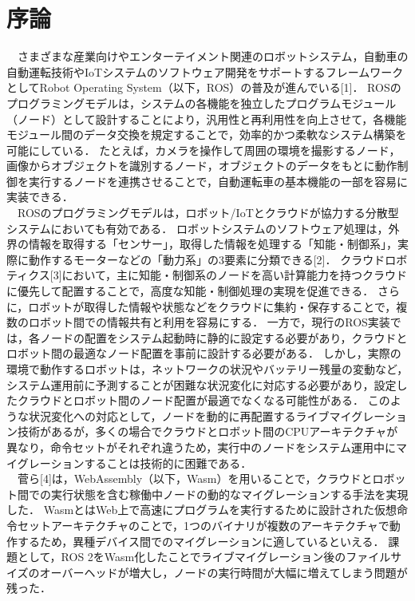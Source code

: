 \chapter{序論}
　さまざまな産業向けやエンターテイメント関連のロボットシステム，自動車の自動運転技術やIoTシステムのソフトウェア開発をサポートするフレームワークとしてRobot Operating System（以下，ROS）の普及が進んでいる[1]．
ROSのプログラミングモデルは，システムの各機能を独立したプログラムモジュール（ノード）として設計することにより，汎用性と再利用性を向上させて，各機能モジュール間のデータ交換を規定することで，効率的かつ柔軟なシステム構築を可能にしている．
たとえば，カメラを操作して周囲の環境を撮影するノード，画像からオブジェクトを識別するノード，オブジェクトのデータをもとに動作制御を実行するノードを連携させることで，自動運転車の基本機能の一部を容易に実装できる．
\\　ROSのプログラミングモデルは，ロボット/IoTとクラウドが協力する分散型システムにおいても有効である．
ロボットシステムのソフトウェア処理は，外界の情報を取得する「センサー」，取得した情報を処理する「知能・制御系」，実際に動作するモーターなどの「動力系」の3要素に分類できる[2]．
クラウドロボティクス[3]において，主に知能・制御系のノードを高い計算能力を持つクラウドに優先して配置することで，高度な知能・制御処理の実現を促進できる．
さらに，ロボットが取得した情報や状態などをクラウドに集約・保存することで，複数のロボット間での情報共有と利用を容易にする．
一方で，現行のROS実装では，各ノードの配置をシステム起動時に静的に設定する必要があり，クラウドとロボット間の最適なノード配置を事前に設計する必要がある．
しかし，実際の環境で動作するロボットは，ネットワークの状況やバッテリー残量の変動など，システム運用前に予測することが困難な状況変化に対応する必要があり，設定したクラウドとロボット間のノード配置が最適でなくなる可能性がある．
このような状況変化への対応として，ノードを動的に再配置するライブマイグレーション技術があるが，多くの場合でクラウドとロボット間のCPUアーキテクチャが異なり，命令セットがそれぞれ違うため，実行中のノードをシステム運用中にマイグレーションすることは技術的に困難である．
\\　菅ら[4]は，WebAssembly（以下，Wasm）を用いることで，クラウドとロボット間での実行状態を含む稼働中ノードの動的なマイグレーションする手法を実現した．
WasmとはWeb上で高速にプログラムを実行するために設計された仮想命令セットアーキテクチャのことで，1つのバイナリが複数のアーキテクチャで動作するため，異種デバイス間でのマイグレーションに適しているといえる．
課題として，ROS 2をWasm化したことでライブマイグレーション後のファイルサイズのオーバーヘッドが増大し，ノードの実行時間が大幅に増えてしまう問題が残った．
